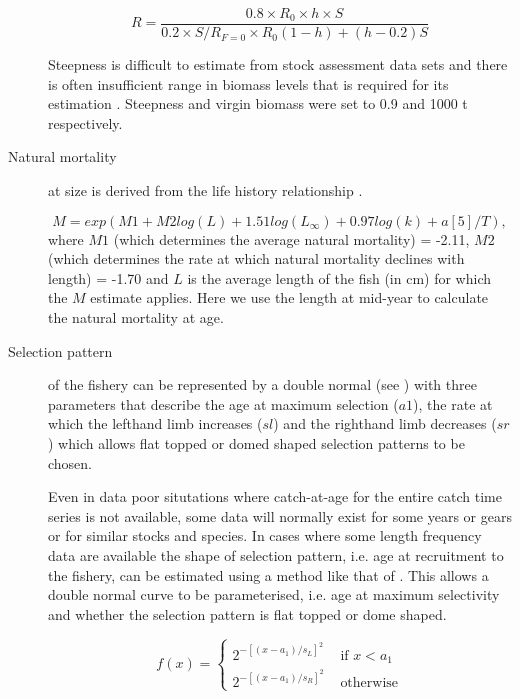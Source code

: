 \documentclass{pnastwo}
\begin{document}
\begin{article}
\begin{description}
\begin{equation}
R=\frac{0.8 \times R_0 \times h \times S}{0.2 \times S/R_{F=0} \times R_0(1-h)+(h-0.2)S}
\end{equation} 

Steepness is difficult to estimate from stock assessment data sets and there is often insufficient range in biomass levels that is required for its estimation \cite{ISSF2011steep}.
Steepness and virgin biomass were set to 0.9 and 1000 t respectively.

\item[Natural mortality]
at size is derived from the life history relationship \cite{gislason2010does}.
               
\begin{equation}
            M = exp(M1 + M2 log(L) + 1.51log(L_{\infty}) + 0.97log(k) + a[5]/T),
\end{equation} 
where $M1$ (which determines the average natural mortality) = -2.11, $M2$ (which determines the rate at which natural mortality declines with length) = -1.70 and $L$ is 
the average length of the fish (in cm) for which the $M$ estimate applies. Here we use the length at mid-year to calculate the natural mortality at age.


\item[Selection pattern] 
of the fishery can be represented by a double normal 
(see \cite{Hilbornetal2000}) with three parameters that describe the age at maximum selection ($a1$), the rate at which the lefthand 
limb increases ($sl$) and the righthand limb decreases ($sr$) which allows flat topped or domed shaped selection patterns to be chosen.

Even in data poor situtations where catch-at-age for the entire catch time series is not available, some data will normally exist for 
some years or gears or for similar stocks and species. In cases where some length frequency data are available the shape of selection pattern, i.e.
age at recruitment to the fishery, can be estimated using a method like that of \cite{wetherall1987estimating}. This allows
a double normal curve to be parameterised, i.e. age at maximum selectivity and whether the selection pattern is flat topped or dome shaped.

\begin{equation}
f(x) = \left\{ \begin{array}{rl}
 2^{-[(x-a_1)/s_L]^2} &\mbox{ if $x<a_1$} \\
 2^{-[(x-a_1)/s_R]^2} &\mbox{ otherwise}
       \end{array} \right.
\end{equation}
 

\end{description}
\end{article}
\end{document}
